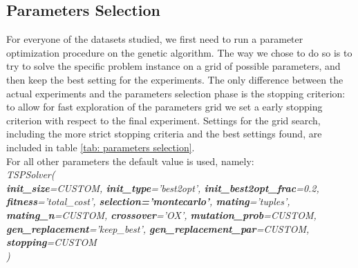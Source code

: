 \documentclass{article}
\begin{document}
\subsection{Parameters Selection}\label{sec: parameters selection}
For everyone of the datasets studied, we first need to run a parameter optimization procedure on the genetic algorithm. The way we chose to do so is to try to solve the specific problem instance on a grid of possible parameters, and then keep the best setting for the experiments. The only difference between the actual experiments and the parameters selection phase is the stopping criterion: to allow for fast exploration of the parameters grid we set a early stopping criterion with respect to the final experiment. Settings for the grid search, including the more strict stopping criteria and the best settings found, are included in table \ref{tab: parameters selection}. \\ \newpage
For all other parameters the default value is used, namely: \\
\newline
\textit{
TSPSolver( \\
\textbf{init\_size}=CUSTOM, \textbf{init\_type}='best2opt', \textbf{init\_best2opt\_frac}=0.2, \\
\textbf{fitness}='total\_cost', \textbf{selection='montecarlo'}, \textbf{mating}='tuples', \\
\textbf{mating\_n}=CUSTOM, \textbf{crossover}='OX', \textbf{mutation\_prob}=CUSTOM,\\
\textbf{gen\_replacement}='keep\_best', \textbf{gen\_replacement\_par}=CUSTOM, \\
\textbf{stopping}=CUSTOM \\
)
}
\newline
\end{document}
